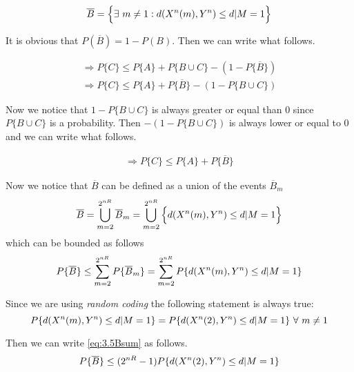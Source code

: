\begin{align*}
	\overline{B} = \Big \{ \exists \  m \neq 1 : d(X^n(m),Y^n) \leq d | M = 1 \Big \}
\end{align*}

 It is obvious that $P(\overline{B})=1-P(B)$. Then we can write what follows.

 \begin{equation}
 	\begin{gathered}
		\Rightarrow P \{ C \} \leq P \{ A \} + P \{ B \cup C \} -(1-P\{\overline{B} \})  \\
		\Rightarrow P \{ C \} \leq P \{ A \} + P\{\overline{B} \}-(1-P \{ B \cup C \} )
 	\end{gathered}
 \end{equation}

Now we notice that $1-P \{ B \cup C \}$ is always greater or equal than $0$ since $P \{ B \cup C \}$ is a probability. Then $-(1-P \{ B \cup C \})$ is always lower or equal to $0$ and we can write what follows.

\begin{equation}
 \begin{gathered}
	 \Rightarrow P \{ C \} \leq P \{ A \} + P\{\overline{B} \}
 \end{gathered}
\label{eq:3.5diseq}
\end{equation}

Now we notice that $\overline{B}$ can be defined as a union of the events $\overline{B}_m$
%
\begin{equation}
		\overline{B} = \bigcup _{m=2}^{2^{nR}} \overline{B}_m = \bigcup _{m=2}^{2^{nR}} \Big \{ d(X^n(m),Y^n) \leq d | M = 1\Big \}
		\label{eq:3.5Bunion}
\end{equation}
%
which can be bounded as follows
%
\begin{equation}
	P\{\overline{B} \} \leq \sum_{m=2}^{2^{nR}} P \{ \overline{B}_m \} = \sum_{m=2}^{2^{nR}} P \{ d(X^n(m),Y^n) \leq d | M = 1 \}
	\label{eq:3.5Bsum}
\end{equation}

Since we are using \textit{random coding} the following statement is always true:
%
\begin{equation}
	P \{ d(X^n(m),Y^n) \leq d | M = 1 \} = P \{ d(X^n(2),Y^n) \leq d | M = 1  \} \ \forall \ m \neq 1
\end{equation}

Then we can write \eqref{eq:3.5Bsum} as follows.
%
\begin{equation}
	P\{\overline{B} \} \leq (2^{nR}-1) P \{ d(X^n(2),Y^n) \leq d | M = 1 \}
	\label{eq:3.5Bbound}
\end{equation}

